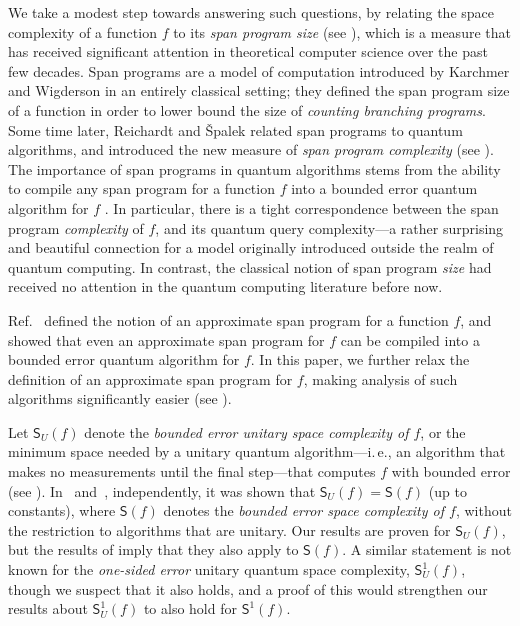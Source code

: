 \documentclass[11pt]{article}
\numberwithin{equation}{section}
\theoremstyle{definition}
\theoremstyle{plain}
\newcommand{\ie}{i.\,e.}
\begin{document}
We take a modest step towards answering such questions, by relating the space complexity of a function $f$ to its \emph{span program size} (see ), which is a measure that has received significant attention in theoretical computer science over the past few decades. Span programs are a model of computation introduced by Karchmer and Wigderson \cite{KW93} in an entirely classical setting; they defined the span program size of a function in order to lower bound the size of \emph{counting branching programs}. Some time later, Reichardt and \v{S}palek \cite{RS12} related span programs to quantum algorithms, and introduced the new measure of \emph{span program complexity} (see ). The importance of span programs in quantum algorithms stems from the ability to compile any span program for a function $f$ into a bounded error quantum algorithm for $f$ \cite{Rei09}. In particular, there is a tight correspondence between the span program \emph{complexity} of $f$, and its quantum query
complexity---a rather surprising and beautiful connection for a model originally introduced outside the realm of quantum computing. In contrast, the classical notion of span program \emph{size} had received no attention in the quantum computing literature before now. 

Ref.~\cite{IJ15} defined the notion of an approximate span program for a function $f$, and showed that even an approximate span program for $f$ can be compiled into a bounded error quantum algorithm for $f$. In this
%
paper,  %
we further relax the definition of an approximate span program for $f$, making analysis of such algorithms significantly easier (see ).

Let $\mathsf{S}_U(f)$ denote the \emph{bounded error unitary space complexity of $f$}, or the minimum space needed by a unitary quantum algorithm---\ie, an algorithm that makes no measurements until the final step---that computes $f$ with bounded error (see ). In~\cite{FR21} and~\cite{GRZ20}, independently, it was shown that $\mathsf{S}_U(f)=\mathsf{S}(f)$ (up to constants), where $\mathsf{S}(f)$ denotes the \emph{bounded error space complexity of $f$}, {without} the restriction to algorithms that are unitary. Our results are proven for $\mathsf{S}_U(f)$, but the results of \cite{FR21,GRZ20} imply that they also apply to $\mathsf{S}(f)$. A similar statement is not known for the \emph{one-sided error} unitary quantum space complexity, $\mathsf{S}^1_U(f)$, though we suspect that it also holds, and a proof of this would strengthen our results about $\mathsf{S}^1_U(f)$ to also hold for $\mathsf{S}^1(f)$. 
\end{document}
